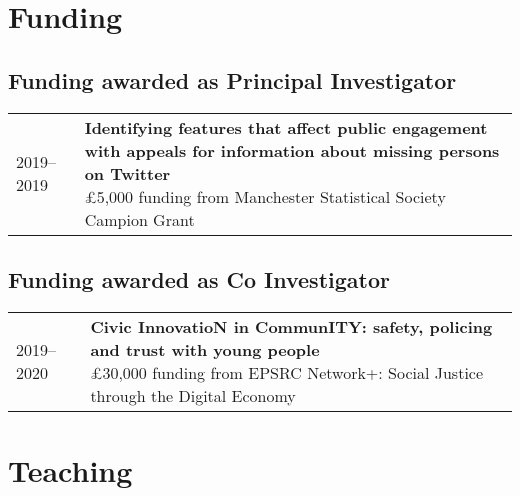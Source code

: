 \documentclass[10pt,a4paper,]{article}
\makeatletter
\def\briefitem#1#2#3{
#2 & \parbox[t]{0.85\textwidth}{%
      \textbf{#1}\\[-0.1cm]{\footnotesize #3}}\\[0.4cm]}
\def\briefsection#1{\begin{longtable}{@{\extracolsep{\fill}}ll}#1\end{longtable}}
\makeatother
\begin{document}
\nocite{solymosi2019lse,
solymosi2019sagepub,
solymosi2019webinar,
solymosi2019ssi6,
solymosi2018ssi5,
solymosi2018ssi4,
solymosi2018ssi3,
solymosi2018ssi2,
solymosi2018ssi1,
solymosi2016confidence,
solymosia2014mapping,
solymosi2014tsc}

\hypertarget{funding}{%
\section{Funding}\label{funding}}

\hypertarget{funding-awarded-as-principal-investigator}{%
\subsection{Funding awarded as Principal Investigator}\label{funding-awarded-as-principal-investigator}}

\briefsection{\briefitem{Identifying features that affect public engagement with appeals for information about missing persons on Twitter}{2019–2019}{£5,000 funding from Manchester Statistical Society Campion Grant}\briefitem{Using Bayesian Surprise maps to explore debt and insolvency across the UK}{2018–2019}{£10,000 funding from Consumer Data Research Centre, Economic and Social Research Council}\briefitem{Measuring fear of crime using app-based and sensing methodologies}{2017–2020}{£10,000 funding from British Academy and Leverhulme Small Grants}\briefitem{Building Tools and Training for Crime Analysts using R}{2017–2017}{£3,000 funding from N8 Policing Research Partnership}\briefitem{Data Visualisation in Criminal Courts}{2017–2017}{£1,000 funding from Economic Social Research Council, Festival of Social Sciences}}

\hypertarget{funding-awarded-as-co-investigator}{%
\subsection{Funding awarded as Co Investigator}\label{funding-awarded-as-co-investigator}}

\briefsection{\briefitem{Civic InnovatioN in CommunITY: safety, policing and trust with young people}{2019–2020}{£30,000 funding from EPSRC Network+: Social Justice through the Digital Economy}}

\hypertarget{teaching}{%
\section{Teaching}\label{teaching}}
\end{document}
